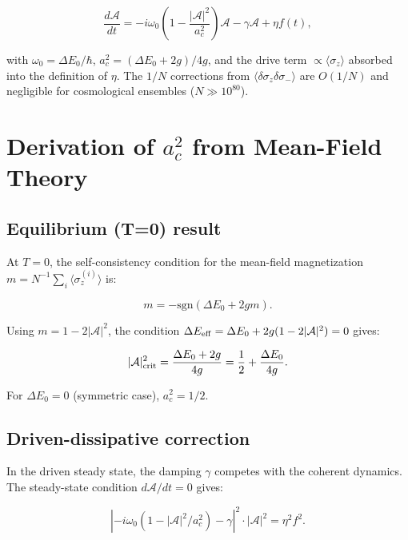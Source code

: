 \documentclass[aps,prd,onecolumn]{revtex4-2}
\begin{document}
\begin{equation}
\frac{d\mathcal{A}}{dt} = -i\omega_0\left(1 - \frac{|\mathcal{A}|^2}{a_c^2}\right)\mathcal{A} - \gamma\mathcal{A} + \eta f(t),
\end{equation}

with $\omega_0 = \Delta E_0/\hbar$, $a_c^2 = (\Delta E_0 + 2g)/4g$, and the drive term $\propto \langle\sigma_z\rangle$ absorbed into the definition of $\eta$. The $1/N$ corrections from $\langle\delta\sigma_z\delta\sigma_-\rangle$ are $O(1/N)$ and negligible for cosmological ensembles ($N \gg 10^{80}$).

\section{Derivation of $a_c^2$ from Mean-Field Theory}

\subsection{Equilibrium (T=0) result}

At $T=0$, the self-consistency condition for the mean-field magnetization $m = N^{-1}\sum_i\langle\sigma_z^{(i)}\rangle$ is:

\begin{equation}
m = -\text{sgn}(\Delta E_0 + 2gm).
\end{equation}

Using $m = 1 - 2|\mathcal{A}|^2$, the condition $\Delta E_{\rm eff} = \Delta E_0 + 2g(1-2|\mathcal{A}|^2) = 0$ gives:

\begin{equation}
|\mathcal{A}|^2_{\rm crit} = \frac{\Delta E_0 + 2g}{4g} = \frac{1}{2} + \frac{\Delta E_0}{4g}.
\end{equation}

For $\Delta E_0 = 0$ (symmetric case), $a_c^2 = 1/2$.

\subsection{Driven-dissipative correction}

In the driven steady state, the damping $\gamma$ competes with the coherent dynamics. The steady-state condition $d\mathcal{A}/dt = 0$ gives:

\begin{equation}
|-i\omega_0(1 - |\mathcal{A}|^2/a_c^2) - \gamma|^2 \cdot |\mathcal{A}|^2 = \eta^2 f^2.
\end{equation}
\end{document}
